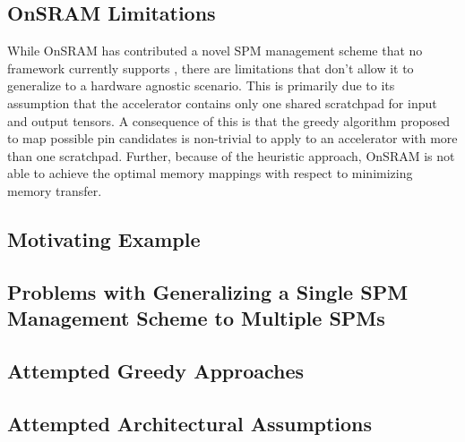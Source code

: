 
\subsection{OnSRAM Limitations}

While OnSRAM has contributed a novel SPM management scheme that no framework
currently supports \cite{onsram}, there are limitations that don't allow it to
generalize to a hardware agnostic scenario. This is primarily due to its
assumption that the accelerator contains only one shared scratchpad for input
and output tensors. A consequence of this is that the greedy algorithm proposed
to map possible pin candidates is non-trivial to apply to an accelerator with
more than one scratchpad. Further, because of the heuristic approach, OnSRAM is not able
to achieve the optimal memory mappings with respect to minimizing memory transfer.


\subsection{Motivating Example}


\subsection{Problems with Generalizing a Single SPM Management Scheme to Multiple SPMs}
\subsection{Attempted Greedy Approaches}
\subsection{Attempted Architectural Assumptions}
